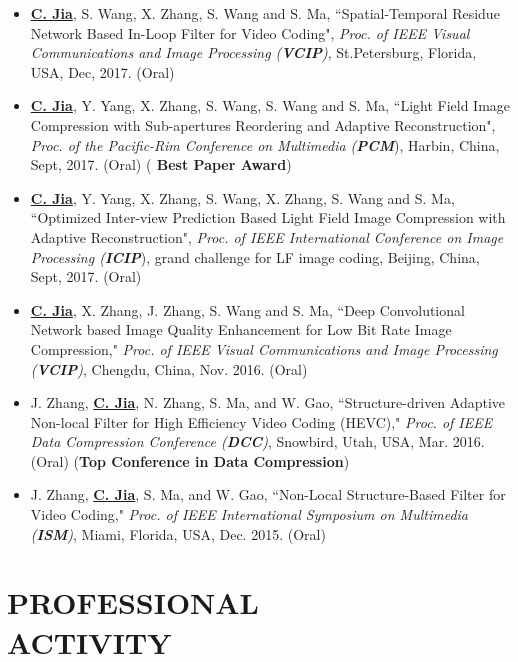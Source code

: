 \documentclass[margin, 10pt]{res} %
\begin{document}
\begin{resume}
\begin{itemize}
\item{\underline{\bf C. Jia}, S. Wang, X. Zhang, S. Wang and S. Ma, ``Spatial-Temporal Residue Network Based In-Loop Filter for Video Coding", {\em Proc. of IEEE Visual Communications and Image Processing ({\bf VCIP})}, St.Petersburg, Florida, USA, Dec, 2017. (Oral)}

\item{\underline{\bf C. Jia}, Y. Yang, X. Zhang, S. Wang, S. Wang and S. Ma, ``Light Field Image Compression with Sub-apertures Reordering and Adaptive Reconstruction", {\em Proc. of the Pacific-Rim Conference on Multimedia ({\bf PCM}}), Harbin, China, Sept, 2017. (Oral)} ({\bf{\color{red} Best Paper Award}})

\item{\underline{\bf C. Jia}, Y. Yang, X. Zhang, S. Wang, X. Zhang, S. Wang and S. Ma, ``Optimized Inter-view Prediction Based Light Field Image Compression with Adaptive Reconstruction", {\em Proc. of IEEE International Conference on Image Processing ({\bf ICIP}}), grand challenge for LF image coding, Beijing, China, Sept, 2017. (Oral)}

\item{\underline{\bf C. Jia}, X. Zhang, J. Zhang, S. Wang and S. Ma, ``Deep Convolutional Network based Image Quality Enhancement for Low Bit Rate Image Compression," {\em Proc. of IEEE Visual Communications and Image Processing ({\bf VCIP})}, Chengdu, China, Nov. 2016. (Oral)}

\item{J. Zhang, \underline{\bf C. Jia},  N. Zhang, S. Ma, and W. Gao, ``Structure-driven Adaptive Non-local Filter for High Efficiency Video Coding (HEVC)," {\em Proc. of IEEE Data Compression Conference ({\bf DCC})}, Snowbird, Utah, USA, Mar. 2016. (Oral) ({\bf Top Conference in Data Compression})}

\item{J. Zhang, \underline{\bf C. Jia}, S. Ma, and W. Gao, ``Non-Local Structure-Based Filter for Video Coding," {\em Proc. of IEEE International Symposium on Multimedia ({\bf ISM})}, Miami, Florida, USA, Dec. 2015. (Oral)}

\end{itemize}



\section{PROFESSIONAL \\ ACTIVITY}


\end{resume}
\end{document}
